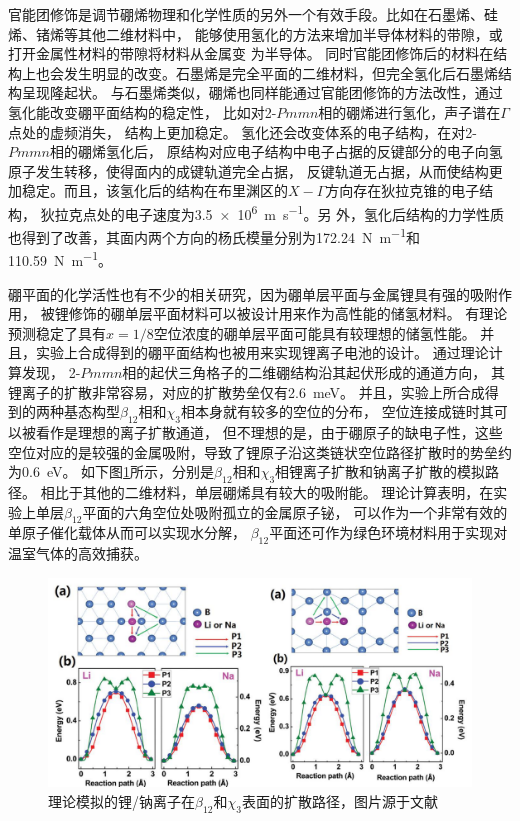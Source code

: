 官能团修饰是调节硼烯物理和化学性质的另外一个有效手段。比如在石墨烯、硅烯、锗烯等其他二维材料中，
能够使用氢化的方法来增加半导体材料的带隙，或打开金属性材料的带隙将材料从金属变
为半导体\cite{balog2010bandgap,bhattacharya2011strain,houssa2011electronic}。
同时官能团修饰后的材料在结构上也会发生明显的改变。石墨烯是完全平面的二维材料，但完全氢化后石墨烯结构呈现隆起状。
与石墨烯类似，硼烯也同样能通过官能团修饰的方法改性，通过氢化能改变硼平面结构的稳定性，
比如对2-$Pmmn$相的硼烯进行氢化，声子谱在$\Gamma$点处的虚频消失，
结构上更加稳定\cite{xu2016hydrogenated,wang2016high}。
氢化还会改变体系的电子结构\cite{xu2016hydrogenated}，在对2-$Pmmn$相的硼烯氢化后，
原结构对应电子结构中电子占据的反键部分的电子向氢原子发生转移，使得面内的成键轨道完全占据，
反键轨道无占据，从而使结构更加稳定。而且，该氢化后的结构在布里渊区的$X-\Gamma$方向存在狄拉克锥的电子结构，
狄拉克点处的电子速度为\SI{3.5e6}{\metre\per\second}\cite{xu2016hydrogenated}。另
外，氢化后结构的力学性质也得到了改善，其面内两个方向的杨氏模量分别为\SI{172.24}{\N\per\meter}和
\SI{110.59}{\N\per\meter}\cite{wang2016high}。

硼平面的化学活性也有不少的相关研究，因为硼单层平面与金属锂具有强的吸附作用，
被锂修饰的硼单层平面材料可以被设计用来作为高性能的储氢材料。
有理论\cite{li2015ultrahigh}预测稳定了具有$x=1/8$空位浓度的硼单层平面可能具有较理想的储氢性能。
并且，实验上合成得到的硼平面结构也被用来实现锂离子电池的设计。
通过理论计算\cite{jiang2016borophene}发现，
2-$Pmmn$相的起伏三角格子的二维硼结构沿其起伏形成的通道方向，
其锂离子的扩散非常容易，对应的扩散势垒仅有\SI{2.6}{\meV}。
并且，实验上所合成得到的两种基态构型$\beta_{12}$相和$\chi_3$相本身就有较多的空位的分布，
空位连接成链时其可以被看作是理想的离子扩散通道\cite{zhang2016borophene}，
但不理想的是，由于硼原子的缺电子性，这些空位对应的是较强的金属吸附，导致了锂原子沿这类链状空位路径扩散时的势垒约为\SI{0.6}{\eV}。
如下图\ref{fig:ch1_lina_borophene}所示，分别是$\beta_{12}$相和$\chi_3$相锂离子扩散和钠离子扩散的模拟路径。
相比于其他的二维材料，单层硼烯具有较大的吸附能。
理论计算表明\cite{ling2017nanosheet}，在实验上单层$\beta_{12}$平面的六角空位处吸附孤立的金属原子铋，
可以作为一个非常有效的单原子催化载体从而可以实现水分解，
$\beta_{12}$平面还可作为绿色环境材料用于实现对温室气体的高效捕获\cite{tan2017borophene}。

\begin{figure}[bt]
  \includegraphics[width=1.0\textwidth]{figs/ch1_lina_borophene.png}
  \centering
  \caption{理论模拟的锂/钠离子在$\beta_{12}$和$\chi_3$表面的扩散路径，图片源于文献\cite{zhang2016borophene}}
  \label{fig:ch1_lina_borophene}
\end{figure}

